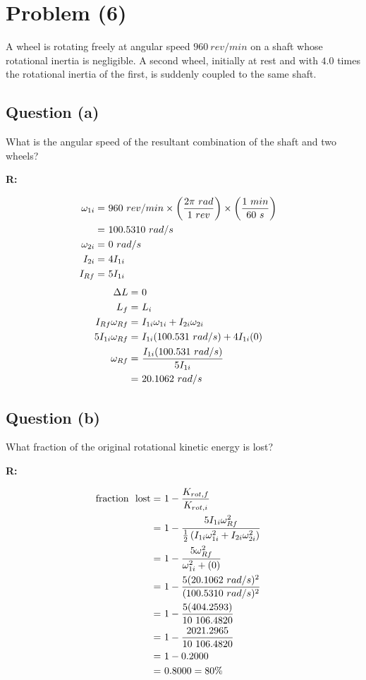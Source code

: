 \section{Problem (6)}
	A wheel is rotating freely at angular speed $960 \ rev/min$ on a shaft whose rotational inertia is negligible. A second wheel, initially at rest and with $4.0$ times the rotational inertia of the first, is suddenly coupled to the same shaft.

	\subsection{Question (a)}

		What is the angular speed of the resultant combination of the shaft and two wheels?

		\textbf{R:}

		\begin{align}
			\omega_{1i} = \ &960 \ rev/min
			\times \left( \frac{2 \pi \ rad}{1 \ rev} \right)
			\times \left( \frac{1 \ min}{60 \ s} \right)& \notag \\
			= \ &100.5310 \ rad/s& \notag \\
			\omega_{2i} = \ &0 \ rad/s& \notag \\
			I_{2i} = \ &4I_{1i}& \notag \\
			I_{Rf} = \ &5I_{1i}& \notag
		\end{align}
		\begin{align}
			\Delta L = \ &0& \notag \\
			L_{f} = \ &L_{i}& \notag \\
			I_{Rf}\omega_{Rf} = \ &I_{1i}\omega_{1i} + I_{2i}\omega_{2i}& \notag \\
			5I_{1i}\omega_{Rf} = \ &I_{1i}(100.531 \ rad/s) + 4I_{1i}(0)& \notag \\
			\omega_{Rf} = \ &\frac{I_{1i}(100.531 \ rad/s)}{5I_{1i}}& \notag \\
			= \ &20.1062 \ rad/s&
		\end{align}

	\subsection{Question (b)}

		What fraction of the original rotational kinetic energy is lost?

		\textbf{R:}

		\begin{align}
			\text{fraction \ lost} = \ &1 - \frac{K_{rot,f}}{K_{rot,i}}& \notag \\
			= \ &1 - \frac{5I_{1i}\omega_{Rf}^{2}}{\frac{1}{2}\left( I_{1i}\omega_{1i}^{2} + I_{2i}\omega_{2i}^{2} \right)}& \notag \\
			= \ &1 - \frac{5\omega_{Rf}^{2}}{\omega_{1i}^{2} + (0)}& \notag \\
			= \ &1 - \frac{5(20.1062 \ rad/s)^{2}}{(100.5310 \ rad/s)^{2}}& \notag \\
			= \ &1 - \frac{5(404.2593)}{10 \ 106.4820}& \notag \\
			= \ &1 - \frac{2021.2965}{10 \ 106.4820}& \notag \\
			= \ &1 - 0.2000& \notag \\
			= \ &0.8000 = 80 \%&
		\end{align}
